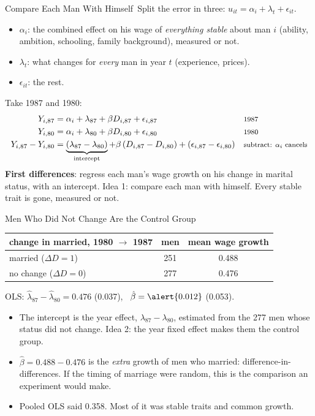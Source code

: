 \documentclass[aspectratio=169,11pt,xcolor=dvipsnames]{beamer}
\newcommand{\core}{\,\raisebox{0.6pt}{\textcolor{corestar}{$\bigstar$}}}
\begin{document}
\begin{frame}{Compare Each Man With Himself\core}
Split the error in three: $u_{it} = \alpha_i + \lambda_t + \epsilon_{it}$.
\begin{itemize}\itemsep2pt
  \item $\alpha_i$: the combined effect on his wage of \emph{everything stable} about
        man $i$ (ability, ambition, schooling, family background), measured or not.
  \item $\lambda_t$: what changes for \emph{every} man in year $t$ (experience, prices).
  \item $\epsilon_{it}$: the rest.
\end{itemize}
Take 1987 and 1980:
\begin{align*}
  Y_{i,87} &= \alpha_i + \lambda_{87} + \beta D_{i,87} + \epsilon_{i,87}
   && \text{\footnotesize 1987} \\
  Y_{i,80} &= \alpha_i + \lambda_{80} + \beta D_{i,80} + \epsilon_{i,80}
   && \text{\footnotesize 1980} \\
  Y_{i,87} - Y_{i,80} &= \underbrace{(\lambda_{87} - \lambda_{80})}_{\text{intercept}}
   + \beta\,(D_{i,87} - D_{i,80}) + (\epsilon_{i,87} - \epsilon_{i,80})
   && \text{\footnotesize subtract: $\alpha_i$ cancels}
\end{align*}
\textbf{First differences}: regress each man's wage growth on his change in marital
status, with an intercept. \alert{Idea 1: compare each man with himself.} Every stable
trait is gone, measured or not.
\end{frame}

\begin{frame}{Men Who Did Not Change Are the Control Group\core}
\begin{center}\small
\renewcommand{\arraystretch}{1.1}
\begin{tabular}{@{}lcc@{}}
\toprule
change in married, 1980 $\to$ 1987 & men & mean wage growth \\
\midrule
married ($\Delta D = 1$) & 251 & 0.488 \\
no change ($\Delta D = 0$) & 277 & 0.476 \\
\bottomrule
\end{tabular}
\end{center}
\vskip2pt
OLS: $\hat\lambda_{87} - \hat\lambda_{80} = 0.476$ (0.037), \ $\hat\beta = \alert{0.012}$ (0.053).
\vskip3pt
\begin{itemize}\itemsep3pt
  \item The intercept is the year effect, $\lambda_{87} - \lambda_{80}$, estimated from the 277 men
        whose status did not change. \alert{Idea 2: the year fixed effect makes them the
        control group.}
  \item $\hat\beta = 0.488 - 0.476$ is the \emph{extra} growth of men who married:
        difference-in-differences. If the timing of marriage were random, this is
        the comparison an experiment would make.
  \item Pooled OLS said 0.358. Most of it was stable traits and common growth.
\end{itemize}
\end{frame}
\end{document}
